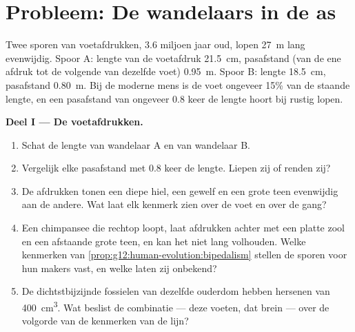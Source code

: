 \section{Probleem: De wandelaars in de as}

\begin{problem}
\label{pb:g12:human-evolution:1}
Twee sporen van voetafdrukken, 3.6 miljoen jaar oud, lopen \qty{27}{m}
lang evenwijdig. Spoor A: lengte van de voetafdruk \qty{21.5}{cm},
pasafstand (van de ene afdruk tot de volgende van dezelfde voet)
\qty{0.95}{m}. Spoor B: lengte \qty{18.5}{cm}, pasafstand \qty{0.80}{m}.
Bij de moderne mens is de voet ongeveer 15\% van de staande lengte, en
een pasafstand van ongeveer 0.8 keer de lengte hoort bij rustig lopen.

\medskip
\noindent\textbf{Deel I --- De voetafdrukken.}
\begin{enumerate}
  \item Schat de lengte van wandelaar A en van wandelaar B.
  \item Vergelijk elke pasafstand met 0.8 keer de lengte. Liepen zij of
        renden zij?
  \item De afdrukken tonen een diepe hiel, een gewelf en een grote teen
        evenwijdig aan de andere. Wat laat elk kenmerk zien over de voet
        en over de gang?
  \item Een chimpansee die rechtop loopt, laat afdrukken achter met een
        platte zool en een afstaande grote teen, en kan het niet lang
        volhouden. Welke kenmerken van
        \cref{prop:g12:human-evolution:bipedalism} stellen de sporen voor
        hun makers vast, en welke laten zij onbekend?
  \item De dichtstbijzijnde fossielen van dezelfde ouderdom hebben
        hersenen van \qty{400}{cm^3}. Wat beslist de combinatie --- deze
        voeten, dat brein --- over de volgorde van de kenmerken van de
        lijn?
\end{enumerate}


\end{problem}
